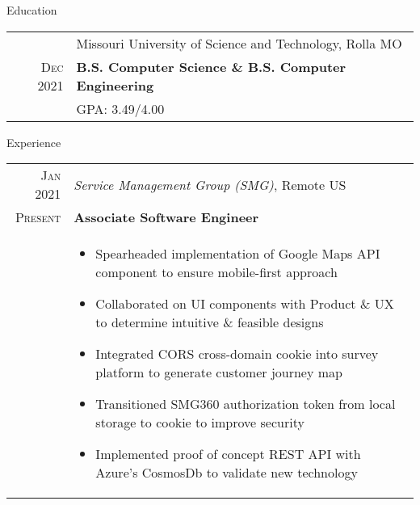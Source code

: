 \documentclass{resume}
\begin{document}
    
\begin{rSection}{Education}
    \small {
    \begin{tabular}{r|p{15cm}}
       & Missouri University of Science and Technology, Rolla MO  \\ 
      \textsc{Dec} 2021 & \textbf{B.S. Computer Science \& B.S. Computer Engineering} \\
      & GPA: 3.49/4.00
    \end{tabular}
    }
\end{rSection}

\begin{rSection}{Experience}
\small
{
  \begin{tabular}{r|p{16cm}}
    \textsc{ Jan 2021} & \textit{Service Management Group (SMG)}, Remote US \\
    \textsc{ Present}  & \textbf{Associate Software Engineer} \\ &
    \begin{itemize}
      \item {Spearheaded implementation of Google Maps API component to ensure mobile-first approach} %
      \item {Collaborated on UI components with Product \& UX to determine intuitive \& feasible designs}
      \item {Integrated CORS cross-domain cookie into survey platform to generate customer journey map}
      \item {Transitioned SMG360 authorization token from local storage to cookie to improve security}
      \item {Implemented proof of concept REST API with Azure's CosmosDb to validate new technology}
    \end{itemize}
  \end{tabular}

}
\end{rSection}
\end{document}
